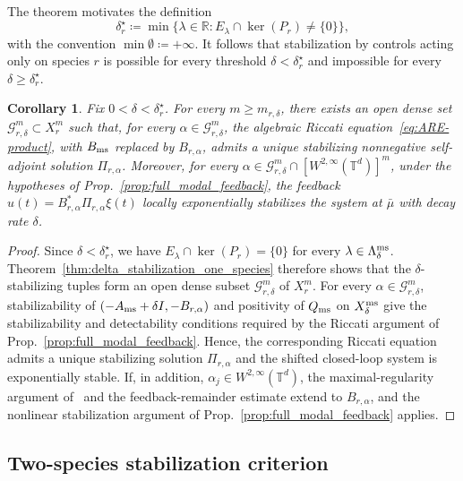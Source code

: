 \documentclass[letterpaper, 10pt, conference]{ieeeconf}
\newtheorem{corollary}[theorem]{Corollary}
\newcommand{\R}{\mathbb{R}}
\newcommand{\T}{\mathbb{T}}
\begin{document}
The theorem motivates the definition
\[
\delta_r^\star \coloneqq \min \{\lambda \in \R : E_\lambda \cap \ker(P_r) \neq \{0\}\},
\]
with the convention $\min \emptyset \coloneqq +\infty$.
It follows that stabilization by controls acting only on species $r$ is possible for every threshold $\delta < \delta_r^\star$ and impossible for every $\delta \ge \delta_r^\star$.

\begin{corollary}
    \label{cor:single_species_riccati}
    Fix $0 < \delta < \delta_r^\star$.
    For every $m \ge m_{r, \delta}$, there exists an open dense set $\mathcal{G}_{r, \delta}^m \subset X_r^m$ such that, for every $\alpha \in \mathcal{G}_{r, \delta}^m$, the algebraic Riccati equation~\eqref{eq:ARE-product}, with $B_{\rm ms}$ replaced by $B_{r,\alpha}$, admits a unique stabilizing nonnegative self-adjoint solution $\Pi_{r,\alpha}$.
    Moreover, for every $\alpha \in \mathcal{G}_{r,\delta}^m \cap [W^{2,\infty}(\T^d)]^m$, under the hypotheses of Prop.~\ref{prop:full_modal_feedback}, the feedback $u(t) = B_{r,\alpha}^\ast \Pi_{r,\alpha} \xi(t)$ locally exponentially stabilizes the system at $\bar\mu$ with decay rate $\delta$.
\end{corollary}

\begin{proof}
    Since $\delta < \delta_r^\star$, we have $E_\lambda \cap \ker(P_r) = \{0\}$ for every $\lambda \in \Lambda_\delta^{\rm ms}$. 
    Theorem~\ref{thm:delta_stabilization_one_species} therefore shows that the $\delta$-stabilizing tuples form an open dense subset $\mathcal{G}_{r,\delta}^m$ of $X_r^m$.
    For every $\alpha \in \mathcal{G}_{r,\delta}^m$, stabilizability of $(-A_{\rm ms} + \delta I, -B_{r,\alpha})$ and positivity of $Q_{\rm ms}$ on $X_\delta^{\rm ms}$ give the stabilizability and detectability conditions required by the Riccati argument of Prop.~\ref{prop:full_modal_feedback}.
    Hence, the corresponding Riccati equation admits a unique stabilizing solution $\Pi_{r,\alpha}$ and the shifted closed-loop system is exponentially stable.
    If, in addition, $\alpha_j \in W^{2,\infty}(\T^d)$, the maximal-regularity argument of~\cite[Thm.~17]{KaliseMoschenPavliotis2025} and the feedback-remainder estimate extend to $B_{r,\alpha}$, and the nonlinear stabilization argument of Prop.~\ref{prop:full_modal_feedback} applies.
\end{proof}

\subsection{Two-species stabilization criterion}
\end{document}
